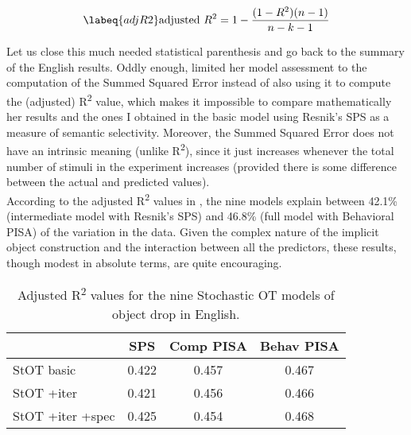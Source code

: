 \begin{equation} \labeq{adjR2}
\textrm{adjusted } R^2 = 1 - \frac{(1-R^2)(n-1)}{n-k-1}
\end{equation}

Let us close this much needed statistical parenthesis and go back to the summary of the English results. Oddly enough, \textcite[147]{Medina2007} limited her model assessment to the computation of the Summed Squared Error instead of also using it to compute the (adjusted) R\textsuperscript{2} value, which makes it impossible to compare mathematically her results and the ones I obtained in the basic model using Resnik's SPS as a measure of semantic selectivity. Moreover, the Summed Squared Error does not have an intrinsic meaning (unlike R\textsuperscript{2}), since it just increases whenever the total number of stimuli in the experiment increases (provided there is some difference between the actual and predicted values).\\
According to the adjusted R\textsuperscript{2} values in , the nine models explain between 42.1\% (intermediate model with Resnik's SPS) and 46.8\% (full model with Behavioral PISA) of the variation in the data. Given the complex nature of the implicit object construction and the interaction between all the predictors, these results, though modest in absolute terms, are quite encouraging.

\begin{table}[htb] %
\caption{Adjusted R\textsuperscript{2} values for the nine Stochastic OT models of object drop in English.}
\begin{tabular}{l|ccc}
& SPS & Comp PISA & Behav PISA \\
\hline
StOT basic           & 0.422        & 0.457     & 0.467      \\
StOT +iter           & 0.421        & 0.456     & 0.466      \\
StOT +iter +spec     & 0.425        & 0.454     & 0.468  
\end{tabular}
\end{table}


